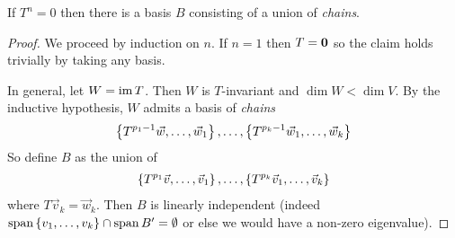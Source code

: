\begin{theorem}
  If $T^n = 0$ then there is a basis $B$ consisting of a union of \emph{chains}.
\end{theorem}
\begin{proof}
  We proceed by induction on $n$. If $n=1$ then $T = {\bf 0}$ so the claim holds trivially by taking any basis.

  In general, let $W = \operatorname{im} T$. Then $W$ is $T$-invariant and $\dim W < \dim V$.
  By the inductive hypothesis, $W$ admits a basis of \emph{chains}
  \begin{align}
    \left\{T^{p_1-1}\vec w,\ldots,\vec w_1\right\}, \ldots, \left\{T^{p_k-1}\vec w_1,\ldots,\vec w_k\right\}
  \end{align}
  So define $B$ as the union of
  \begin{align}
    \left\{T^{p_1}\vec v,\ldots,\vec v_1\right\}, \ldots, \left\{T^{p_k}\vec v_1,\ldots,\vec v_k\right\}
  \end{align}
  where $T\vec v_k = \vec w_k$. Then $B$ is linearly independent (indeed $\text{span}\left\{v_1,\ldots,v_k\right\} \cap \operatorname{span} B' = \emptyset$ or else we would have a non-zero eigenvalue).
\end{proof}
